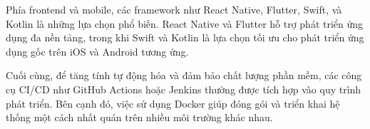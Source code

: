         \vspace{0.5em}
      
        \hspace*{0.8cm}Phía frontend và mobile, các framework như React Native, Flutter, Swift, và Kotlin là những lựa chọn phổ biến. React Native và Flutter hỗ trợ phát triển ứng dụng đa nền tảng, trong khi Swift và Kotlin là lựa chọn tối ưu cho phát triển ứng dụng gốc trên iOS và Android tương ứng.
      
        \vspace{0.5em}
      
        \hspace*{0.8cm}Cuối cùng, để tăng tính tự động hóa và đảm bảo chất lượng phần mềm, các công cụ CI/CD như GitHub Actions hoặc Jenkins thường được tích hợp vào quy trình phát triển. Bên cạnh đó, việc sử dụng Docker giúp đóng gói và triển khai hệ thống một cách nhất quán trên nhiều môi trường khác nhau.
      
   